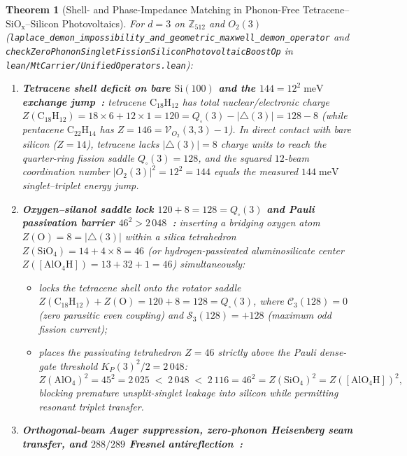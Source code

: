 \documentclass[11pt,a4paper]{article}
\theoremstyle{plain}
\newtheorem{theorem}{Theorem}[section]
\theoremstyle{definition}
\begin{document}
\begin{theorem}[Shell- and Phase-Impedance Matching in Phonon-Free Tetracene--$\mathrm{SiO_x}$--Silicon Photovoltaics]
\label{thm:solar-boost}
For $d=3$ on $\mathbb{Z}_{512}$ and $O_2(3)$ (\texttt{laplace\_demon\_impossibility\_and\_geometric\_maxwell\_demon\_operator} and \texttt{checkZeroPhononSingletFissionSiliconPhotovoltaicBoostOp} in \texttt{lean/MtCarrier/UnifiedOperators.lean}):
\begin{enumerate}[label=\textbf{(\roman*)},leftmargin=*]
\item \textbf{Tetracene shell deficit on bare $\mathrm{Si}(100)$ and the $144 = 12^2\;\text{meV}$ exchange jump~\cite{Klymenko2023}:}
  tetracene $\mathrm{C_{18}H_{12}}$ has total nuclear/electronic charge $Z(\mathrm{C_{18}H_{12}}) = 18\times 6 + 12\times 1 = 120 = Q_\square(3) - |{\triangle}(3)| = 128 - 8$ (while pentacene $\mathrm{C_{22}H_{14}}$ has $Z = 146 = \mathcal{V}_{O_2}(3,3)-1$). In direct contact with bare silicon ($Z=14$), tetracene lacks $|{\triangle}(3)|=8$ charge units to reach the quarter-ring fission saddle $Q_\square(3)=128$, and the squared $12$-beam coordination number $|O_2(3)|^2 = 12^2 = 144$ equals the measured $144\;\text{meV}$ singlet--triplet energy jump.
\item \textbf{Oxygen--silanol saddle lock $120 + 8 = 128 = Q_\square(3)$ and Pauli passivation barrier $46^2 > 2\,048$~\cite{Daiber2020,McNab2026}:}
  inserting a bridging oxygen atom $Z(\mathrm{O}) = 8 = |{\triangle}(3)|$ within a silica tetrahedron $Z(\mathrm{SiO_4}) = 14 + 4\times 8 = 46$ (or hydrogen-passivated aluminosilicate center $Z([\mathrm{AlO_4H}]) = 13 + 32 + 1 = 46$) simultaneously:
  \begin{itemize}[noitemsep]
  \item locks the tetracene shell onto the rotator saddle $Z(\mathrm{C_{18}H_{12}}) + Z(\mathrm{O}) = 120 + 8 = 128 = Q_\square(3)$, where $\mathcal{C}_3(128) = 0$ (zero parasitic even coupling) and $\mathcal{S}_3(128) = +128$ (maximum odd fission current);
  \item places the passivating tetrahedron $Z=46$ strictly above the Pauli dense-gate threshold $K_P(3)^2/2 = 2\,048$:
    \[
      Z(\mathrm{AlO_4})^2 = 45^2 = 2\,025 \;<\; 2\,048 \;<\; 2\,116 = 46^2 = Z(\mathrm{SiO_4})^2 = Z([\mathrm{AlO_4H}])^2,
    \]
    blocking premature unsplit-singlet leakage into silicon while permitting resonant triplet transfer.
  \end{itemize}
\item \textbf{Orthogonal-beam Auger suppression, zero-phonon Heisenberg seam transfer, and $288/289$ Fresnel antireflection~\cite{Benning2026}:}

\end{enumerate}
\end{theorem}
\end{document}
